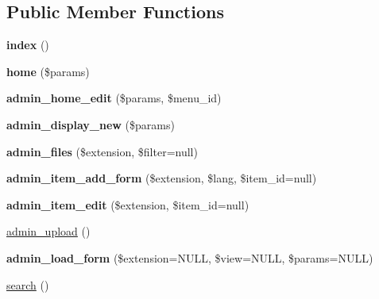\subsection*{\-Public \-Member \-Functions}
\begin{DoxyCompactItemize}
\item 
\hypertarget{class_contents_controller_ade638930c46d36f071380f7bde573e2a}{
{\bfseries index} ()}
\label{class_contents_controller_ade638930c46d36f071380f7bde573e2a}

\item 
\hypertarget{class_contents_controller_a578c9ed72c2008f349aadd054c336857}{
{\bfseries home} (\$params)}
\label{class_contents_controller_a578c9ed72c2008f349aadd054c336857}

\item 
\hypertarget{class_contents_controller_a008c253433a5028857a769ad9c18e24f}{
{\bfseries admin\-\_\-home\-\_\-edit} (\$params, \$menu\-\_\-id)}
\label{class_contents_controller_a008c253433a5028857a769ad9c18e24f}

\item 
\hypertarget{class_contents_controller_a6561e205e9db0e584745b353acf46ea1}{
{\bfseries admin\-\_\-display\-\_\-new} (\$params)}
\label{class_contents_controller_a6561e205e9db0e584745b353acf46ea1}

\item 
\hypertarget{class_contents_controller_aeaa99c0c5c90c8f4ae8fda08712b974c}{
{\bfseries admin\-\_\-files} (\$extension, \$filter=null)}
\label{class_contents_controller_aeaa99c0c5c90c8f4ae8fda08712b974c}

\item 
\hypertarget{class_contents_controller_a9375d5f8b4135a7963f14b8b452e55a8}{
{\bfseries admin\-\_\-item\-\_\-add\-\_\-form} (\$extension, \$lang, \$item\-\_\-id=null)}
\label{class_contents_controller_a9375d5f8b4135a7963f14b8b452e55a8}

\item 
\hypertarget{class_contents_controller_ae0aca53e357347fca70775178164baa5}{
{\bfseries admin\-\_\-item\-\_\-edit} (\$extension, \$item\-\_\-id=null)}
\label{class_contents_controller_ae0aca53e357347fca70775178164baa5}

\item 
\hyperlink{class_contents_controller_a577cc2c16fffc887955d54127a2815d2}{admin\-\_\-upload} ()
\item 
\hypertarget{class_contents_controller_a8efcfceac6758853ea9f38653835c1e0}{
{\bfseries admin\-\_\-load\-\_\-form} (\$extension=\-N\-U\-L\-L, \$view=\-N\-U\-L\-L, \$params=\-N\-U\-L\-L)}
\label{class_contents_controller_a8efcfceac6758853ea9f38653835c1e0}

\item 
\hyperlink{class_contents_controller_a3f52f1b24d81961e58b5dbc10d3b9a95}{search} ()
\end{DoxyCompactItemize}
